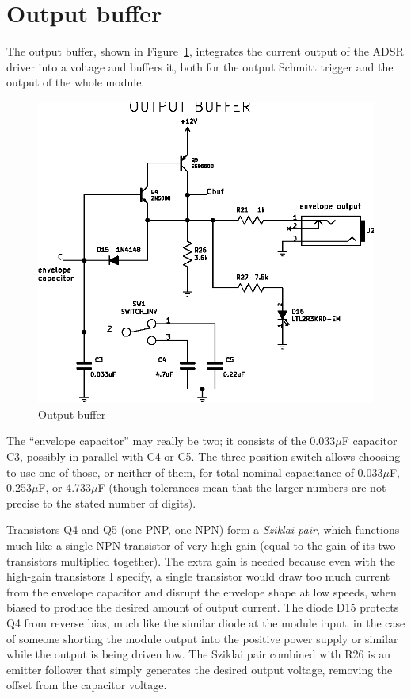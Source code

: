 \section{Output buffer}

The output buffer, shown in Figure~\ref{fig:output-buffer}, integrates the
current output of the ADSR driver into a voltage and buffers it, both for
the output Schmitt trigger and the output of the whole module.

\begin{figure}
  \centering\includegraphics[scale=0.8]{output-buffer}\par
  \caption{Output buffer}
  \label{fig:output-buffer}
\end{figure}

The ``envelope capacitor'' may really be two; it consists of the 0.033$\mu$F
capacitor C3, possibly in parallel with C4 or C5.  The three-position switch
allows choosing to use one of those, or neither of them, for total
nominal capacitance of 0.033$\mu$F, 0.253$\mu$F, or 4.733$\mu$F (though
tolerances mean that the larger numbers are not precise to the stated number
of digits).

Transistors Q4 and Q5 (one PNP, one NPN) form a \emph{Sziklai pair}, which
functions much like a single NPN transistor of very high gain (equal to the
gain of its two transistors multiplied together).  The extra gain is needed
because even with the high-gain transistors I specify, a single transistor
would draw too much current from the envelope capacitor and disrupt the
envelope shape at low speeds, when biased to produce the desired amount of
output current.  The diode D15 protects Q4 from reverse bias, much like the
similar diode at the module input, in the case of someone shorting the
module output into the positive power supply or similar while the output is
being driven low.  The Sziklai pair combined with R26 is an emitter follower
that simply generates the desired output voltage, removing the offset from
the capacitor voltage.

